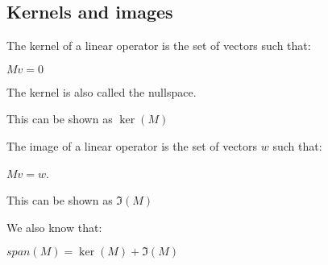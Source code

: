
\subsection{Kernels and images}

The kernel of a linear operator is the set of vectors such that:

\(Mv=0\)

The kernel is also called the nullspace.

This can be shown as \(\ker (M)\)

The image of a linear operator is the set of vectors \(w\) such that:

\(Mv=w\).

This can be shown as \(\Im (M)\)

We also know that:

\(span (M)=\ker (M)+\Im (M)\)

